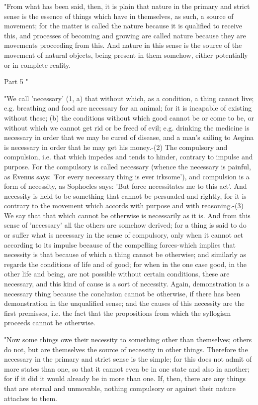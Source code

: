 "From what has been said, then, it is plain that nature in the primary
and strict sense is the essence of things which have in themselves,
as such, a source of movement; for the matter is called the nature
because it is qualified to receive this, and processes of becoming
and growing are called nature because they are movements proceeding
from this. And nature in this sense is the source of the movement
of natural objects, being present in them somehow, either potentially
or in complete reality. 

Part 5 "

"We call 'necessary' (1, a) that without which, as a condition, a
thing cannot live; e.g. breathing and food are necessary for an animal;
for it is incapable of existing without these; (b) the conditions
without which good cannot be or come to be, or without which we cannot
get rid or be freed of evil; e.g. drinking the medicine is necessary
in order that we may be cured of disease, and a man's sailing to Aegina
is necessary in order that he may get his money.-(2) The compulsory
and compulsion, i.e. that which impedes and tends to hinder, contrary
to impulse and purpose. For the compulsory is called necessary (whence
the necessary is painful, as Evenus says: 'For every necessary thing
is ever irksome'), and compulsion is a form of necessity, as Sophocles
says: 'But force necessitates me to this act'. And necessity is held
to be something that cannot be persuaded-and rightly, for it is contrary
to the movement which accords with purpose and with reasoning.-(3)
We say that that which cannot be otherwise is necessarily as it is.
And from this sense of 'necessary' all the others are somehow derived;
for a thing is said to do or suffer what is necessary in the sense
of compulsory, only when it cannot act according to its impulse because
of the compelling forces-which implies that necessity is that because
of which a thing cannot be otherwise; and similarly as regards the
conditions of life and of good; for when in the one case good, in
the other life and being, are not possible without certain conditions,
these are necessary, and this kind of cause is a sort of necessity.
Again, demonstration is a necessary thing because the conclusion cannot
be otherwise, if there has been demonstration in the unqualified sense;
and the causes of this necessity are the first premisses, i.e. the
fact that the propositions from which the syllogism proceeds cannot
be otherwise. 

"Now some things owe their necessity to something other than themselves;
others do not, but are themselves the source of necessity in other
things. Therefore the necessary in the primary and strict sense is
the simple; for this does not admit of more states than one, so that
it cannot even be in one state and also in another; for if it did
it would already be in more than one. If, then, there are any things
that are eternal and unmovable, nothing compulsory or against their
nature attaches to them. 

